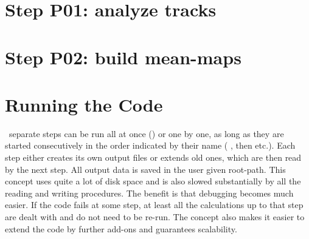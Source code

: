 
\section[Post Processing 1]{Step P01: analyze tracks} \label{P:01}
\TODO{}

\section[Post Processing 2]{Step P02: build mean-maps} \label{P:02}
\TODO{}

\section{Running the Code}
~separate steps can be run all at once () or one by one, as
long as they are started consecutively in the order indicated by their name
( , then  etc.). Each step either creates its own output files or extends old ones,  which are then read by the next step.
All output data is saved in the user given root-path.
This concept uses quite a lot of disk space and is also slowed substantially by all the reading and writing procedures. The benefit is that debugging becomes much easier. If the code fails at some step,
at least all the calculations up to that step are dealt with and do not need to
be re-run. The concept also makes it easier to extend the code by further
add-ons and guarantees scalability.
